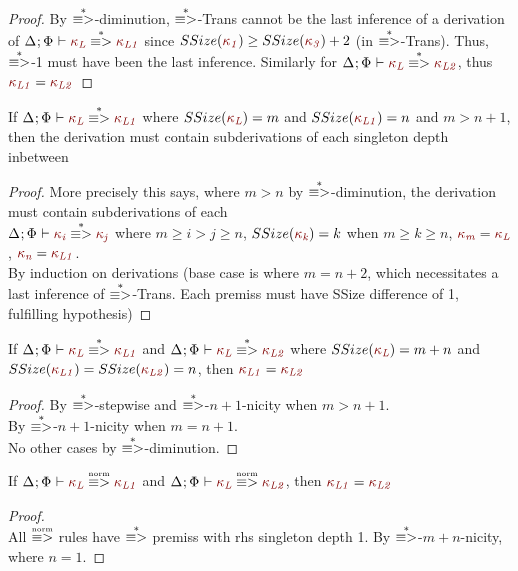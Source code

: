 \documentclass[11pt]{article}
\begin{document}
    \begin{proof}
        By $\stackrel{*}{\equiv >}$-diminution, $\stackrel{*}{\equiv >}$-Trans cannot be the last inference
        of a derivation of $\SReduce{\knd[L]}{\knd[L1]}$
        since $SSize(\knd[1]) \ge SSize(\knd[3]) + 2$ (in $\stackrel{*}{\equiv >}$-Trans).
        Thus, $\stackrel{*}{\equiv >}$-1 must have been the last inference.
        Similarly for $\SReduce{\knd[L]}{\knd[L2]}$,
        thus ${\knd[L1]} = {\knd[L2]}$
    \end{proof}
    \begin{lemma}
        If $\SReduce{\knd[L]}{\knd[L1]}$ where $SSize(\knd[L]) = m$ and $SSize(\knd[L1]) = n$ and $m > n + 1$, then the derivation must contain subderivations of each singleton depth inbetween
    \end{lemma}
    \begin{proof}
        More precisely this says, where $m > n$ by $\stackrel{*}{\equiv >}$-diminution, the derivation must contain subderivations of each \\
        $\SReduce{\knd[i]}{\knd[j]}$ where $m \ge i > j \ge n$, $SSize(\knd[k]) = k$ when $m \ge k \ge n$, $\knd[m] = \knd[L]$, $\knd[n] = \knd[L1]$. \\
        By induction on derivations
        (base case is where $m = n + 2$, which necessitates a last inference of $\stackrel{*}{\equiv >}$-Trans.
        Each premiss must have SSize difference of 1, fulfilling hypothesis)
    \end{proof}
    \begin{lemma}
        If $\SReduce{\knd[L]}{\knd[L1]}$ and $\SReduce{\knd[L]}{\knd[L2]}$ where $SSize(\knd[L]) = m + n$ and $SSize(\knd[L1]) = SSize(\knd[L2]) = n$, then ${\knd[L1]} = {\knd[L2]}$
    \end{lemma}
    \begin{proof}
        By $\stackrel{*}{\equiv >}$-stepwise and $\stackrel{*}{\equiv >}$-$n+1$-nicity when $m > n + 1$. \\
        By $\stackrel{*}{\equiv >}$-$n+1$-nicity when $m = n + 1$. \\
        No other cases by $\stackrel{*}{\equiv >}$-diminution.
    \end{proof}
    \begin{theorem}
        If $\SNormal{\knd[L]}{\knd[L1]}$ and $\SNormal{\knd[L]}{\knd[L2]}$, then ${\knd[L1]} = {\knd[L2]}$
    \end{theorem}
    \begin{proof}
         \\
        All $\stackrel{\text{\tiny norm}}{\equiv >}$ rules have $\stackrel{*}{\equiv >}$ premiss with rhs singleton depth 1.
        By $\stackrel{*}{\equiv >}$-$m+n$-nicity, where $n = 1$.
    \end{proof}
\end{document}
